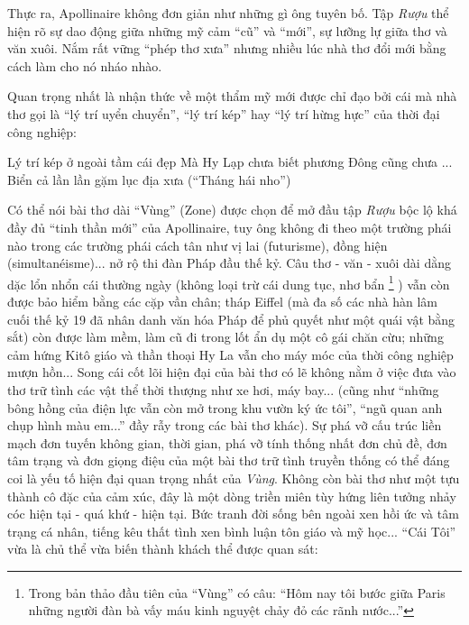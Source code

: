 \documentclass[../main.tex]{subfiles}
\begin{document}
\begin{multicols}{2}
\begin{blockquote}
\end{blockquote}
 
Thực ra, Apollinaire không đơn giản như những gì ông tuyên bố. Tập \textit{Rượu }thể hiện rõ sự dao động giữa những mỹ cảm “cũ” và “mới”, sự lưỡng lự giữa thơ và văn xuôi. Nắm rất vững “phép thơ xưa” nhưng nhiều lúc nhà thơ đổi mới bằng cách làm cho nó nháo nhào. 
 
Quan trọng nhất là nhận thức về một thẩm mỹ mới được chỉ đạo bởi cái mà nhà thơ gọi là “lý trí uyển chuyển”, “lý trí kép” hay “lý trí hừng hực” của thời đại công nghiệp: 
\begin{blockquote}
        
Lý trí kép ở ngoài tầm cái đẹp 
 	Mà Hy Lạp chưa biết phương Đông cũng chưa        
... Biển cả lần lần gặm lục địa xưa 
	(“Tháng hái nho”) 

\end{blockquote}
 
Có thể nói bài thơ dài “Vùng” (Zone) được chọn để mở đầu tập \textit{Rượu} bộc lộ khá đầy đủ “tinh thần mới” của Apollinaire, tuy ông không đi theo một trường phái nào trong các trường phái cách tân như vị lai (futurisme), đồng hiện (simultanéisme)... nở rộ thi đàn Pháp đầu thế kỷ. Câu thơ - văn - xuôi dài dằng dặc lổn nhổn cái thường ngày (không loại trừ cái dung tục, nhơ bẩn \footnote{
Trong bản thảo đầu tiên của “Vùng” có câu: “Hôm nay tôi bước giữa Paris những người đàn bà vấy máu kinh nguyệt chảy đỏ các rãnh nước...”} ) vẫn còn được bảo hiểm bằng các cặp vần chân; tháp Eiffel (mà đa số các nhà hàn lâm cuối thế kỷ 19 đã nhân danh văn hóa Pháp để phủ quyết như một quái vật bằng sắt) còn được làm mềm, làm cũ đi trong lốt ẩn dụ một cô gái chăn cừu; những cảm hứng Kitô giáo và thần thoại Hy La vẫn cho máy móc của thời công nghiệp mượn hồn... Song cái cốt lõi hiện đại của bài thơ có lẽ không nằm ở việc đưa vào thơ trữ tình các vật thể thời thượng như xe hơi, máy bay... (cũng như “những bông hồng của điện lực vẫn còn mở trong khu vườn ký ức tôi”, “ngũ quan anh chụp hình màu em...” đầy rẫy trong các bài thơ khác). Sự phá vỡ cấu trúc liền mạch đơn tuyến không gian, thời gian, phá vỡ tính thống nhất đơn chủ đề, đơn tâm trạng và đơn giọng điệu của một bài thơ trữ tình truyền thống có thể đáng coi là yếu tố hiện đại quan trọng nhất của \textit{Vùng}. Không còn bài thơ như một tựu thành cô đặc của cảm xúc, đây là một dòng triền miên tùy hứng liên tưởng nhảy cóc hiện tại - quá khứ - hiện tại. Bức tranh đời sống bên ngoài xen hồi ức và tâm trạng cá nhân, tiếng kêu thất tình xen bình luận tôn giáo và mỹ học... “Cái Tôi” vừa là chủ thể vừa biến thành khách thể được quan sát: 
\begin{blockquote}
        

\end{blockquote}
\end{multicols}
\end{document}
